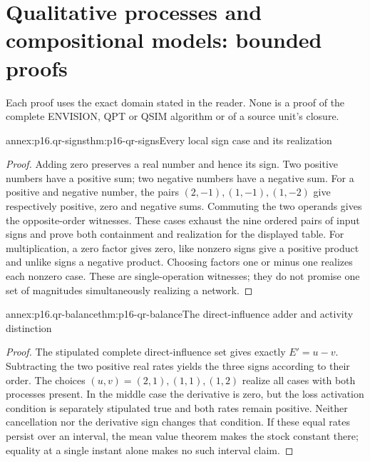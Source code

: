 \section{Qualitative processes and compositional models: bounded proofs}
\label{sec:annex-p16-qualitative-process-and-model-reasoning}

Each proof uses the exact domain stated in the reader. None is a proof of
the complete ENVISION, QPT or QSIM algorithm or of a source unit's closure.

\begin{annexitem}{annex:p16.qr-signs}{thm:p16-qr-signs}{Every local sign case and its realization}
\begin{proof}
Adding zero preserves a real number and hence its sign. Two positive numbers
have a positive sum; two negative numbers have a negative sum. For a positive
and negative number, the pairs \((2,-1),(1,-1),(1,-2)\) give respectively
positive, zero and negative sums. Commuting the two operands gives the
opposite-order witnesses. These cases exhaust the nine ordered pairs of
input signs and prove both containment and realization for the displayed table.
For multiplication, a zero factor gives zero, like nonzero signs give a
positive product and unlike signs a negative product. Choosing factors one
or minus one realizes each nonzero case. These are single-operation witnesses;
they do not promise one set of magnitudes simultaneously realizing a network.
\end{proof}
\end{annexitem}

\begin{annexitem}{annex:p16.qr-balance}{thm:p16-qr-balance}{The direct-influence adder and activity distinction}
\begin{proof}
The stipulated complete direct-influence set gives exactly \(E'=u-v\).
Subtracting the two positive real rates yields the three signs according to
their order. The choices \((u,v)=(2,1),(1,1),(1,2)\) realize all cases
with both processes present. In the middle case the derivative is zero,
but the loss activation condition is separately stipulated true and both
rates remain positive. Neither cancellation nor the derivative sign changes
that condition. If these equal rates persist over an interval, the mean
value theorem makes the stock constant there; equality at a single instant
alone makes no such interval claim.
\end{proof}
\end{annexitem}

